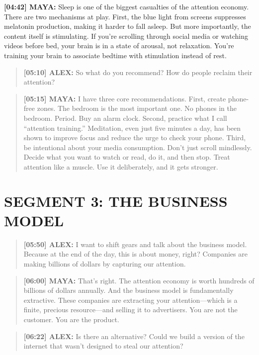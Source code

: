 \documentclass[
    language=english,
    doctype=podcast-script,
    institution=none,
]{../../omnilatex}
\begin{document}
\textbf{[04:42] MAYA:} Sleep is one of the biggest casualties of the attention economy. There are two mechanisms at play. First, the blue light from screens suppresses melatonin production, making it harder to fall asleep. But more importantly, the content itself is stimulating. If you're scrolling through social media or watching videos before bed, your brain is in a state of arousal, not relaxation. You're training your brain to associate bedtime with stimulation instead of rest.

\begin{quote}
\textbf{[05:10] ALEX:} So what do you recommend? How do people reclaim their attention?
\end{quote}

\begin{quote}
\textbf{[05:15] MAYA:} I have three core recommendations. First, create phone-free zones. The bedroom is the most important one. No phones in the bedroom. Period. Buy an alarm clock. Second, practice what I call ``attention training.'' Meditation, even just five minutes a day, has been shown to improve focus and reduce the urge to check your phone. Third, be intentional about your media consumption. Don't just scroll mindlessly. Decide what you want to watch or read, do it, and then stop. Treat attention like a muscle. Use it deliberately, and it gets stronger.
\end{quote}

\section*{SEGMENT 3: THE BUSINESS MODEL}

\begin{quote}
\textbf{[05:50] ALEX:} I want to shift gears and talk about the business model. Because at the end of the day, this is about money, right? Companies are making billions of dollars by capturing our attention.
\end{quote}

\begin{quote}
\textbf{[06:00] MAYA:} That's right. The attention economy is worth hundreds of billions of dollars annually. And the business model is fundamentally extractive. These companies are extracting your attention---which is a finite, precious resource---and selling it to advertisers. You are not the customer. You are the product.
\end{quote}

\begin{quote}
\textbf{[06:22] ALEX:} Is there an alternative? Could we build a version of the internet that wasn't designed to steal our attention?
\end{quote}
\end{document}
